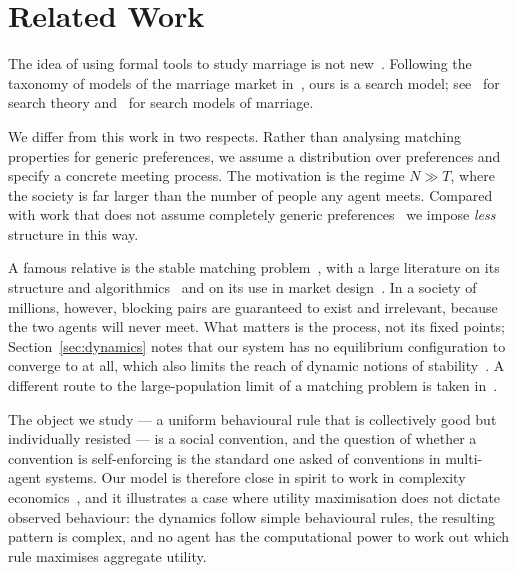 \documentclass[sigconf,anonymous]{aamas}
\begin{document}
\section{Related Work}
\label{sec:related}

The idea of using formal tools to study marriage is not
new~\cite{10.2307/1831130, 10.2307/1829987, 10.2307/1837421}. Following the
taxonomy of models of the marriage market
in~\cite{doi:10.1146/annurev-economics-012320-121610}, ours is a search model;
see~\cite{10.2307/23045893, 10.1257/002205105775362014,
doi:10.1146/annurev-economics-111809-125046, 10.1257/jel.20150777} for search
theory and~\cite{10.2307/2780247, 10.2307/2951279, Burdett1999LongTermPF,
10.2307/2999430, 10.2307/44955185,
RePEc:bpj:bejmac:v:advances.1:y:2001:i:1:n:5} for search models of marriage.

We differ from this work in two respects. Rather than analysing matching
properties for generic preferences, we assume a distribution over preferences
and specify a concrete meeting process. The motivation is the regime $N \gg T$,
where the society is far larger than the number of people any agent meets.
Compared with work that does not assume completely generic
preferences~\cite{doi:10.1086/689869, 10.1093/restud/rdw041} we impose
\emph{less} structure in this way.

A famous relative is the stable matching problem~\cite{10.2307/2312726}, with a
large literature on its structure and
algorithmics~\cite{knuthstable, gusfield1989stable, roth1992two} and on its use
in market design~\cite{article, NBERw29367, ren2021matching}. In a society of
millions, however, blocking pairs are guaranteed to exist and irrelevant,
because the two agents will never meet. What matters is the process, not its
fixed points; Section~\ref{sec:dynamics} notes that our system has no
equilibrium configuration to converge to at all, which also limits the reach of
dynamic notions of stability~\cite{Multi-period, doval2021dynamically,
Credibility, DAMIANO200534, akbarpour2014dynamic, PEREYRA2013100, Doval2015ATO,
StabilityMulti-period, DynamicNonlinear, mairesse2016stability,
https://doi.org/10.3982/ECTA10675}. A different route to the large-population
limit of a matching problem is taken in~\cite{Dzierzawa_2000}.

The object we study --- a uniform behavioural rule that is collectively good but
individually resisted --- is a social convention, and the question of whether a
convention is self-enforcing is the standard one asked of conventions in
multi-agent systems. Our model is therefore close in spirit to work in
complexity economics~\cite{comecon, 10.5555/547051}, and it illustrates a case
where utility maximisation does not dictate observed behaviour: the dynamics
follow simple behavioural rules, the resulting pattern is complex, and no agent
has the computational power to work out which rule maximises aggregate utility.
\end{document}
